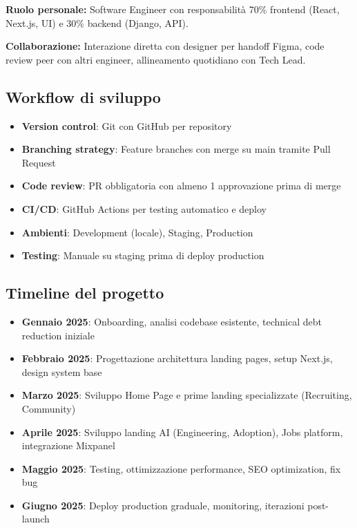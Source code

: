 \textbf{Ruolo personale:} Software Engineer con responsabilità 70\% 
frontend (React, Next.js, UI) e 30\% backend (Django, API).

\textbf{Collaborazione:} Interazione diretta con designer per handoff 
Figma, code review peer con altri engineer, allineamento quotidiano 
con Tech Lead.

\subsection{Workflow di sviluppo}
\begin{itemize}
  \item \textbf{Version control}: Git con GitHub per repository
  \item \textbf{Branching strategy}: Feature branches con merge su main 
        tramite Pull Request
  \item \textbf{Code review}: PR obbligatoria con almeno 1 approvazione 
        prima di merge
  \item \textbf{CI/CD}: GitHub Actions per testing automatico e deploy
  \item \textbf{Ambienti}: Development (locale), Staging, Production
  \item \textbf{Testing}: Manuale su staging prima di deploy production
\end{itemize}

\subsection{Timeline del progetto}
\begin{itemize}
  \item \textbf{Gennaio 2025}: Onboarding, analisi codebase esistente, 
        technical debt reduction iniziale
  \item \textbf{Febbraio 2025}: Progettazione architettura landing pages, 
        setup Next.js, design system base
  \item \textbf{Marzo 2025}: Sviluppo Home Page e prime landing 
        specializzate (Recruiting, Community)
  \item \textbf{Aprile 2025}: Sviluppo landing AI (Engineering, Adoption), 
        Jobs platform, integrazione Mixpanel
  \item \textbf{Maggio 2025}: Testing, ottimizzazione performance, 
        SEO optimization, fix bug
  \item \textbf{Giugno 2025}: Deploy production graduale, monitoring, 
        iterazioni post-launch
\end{itemize}

